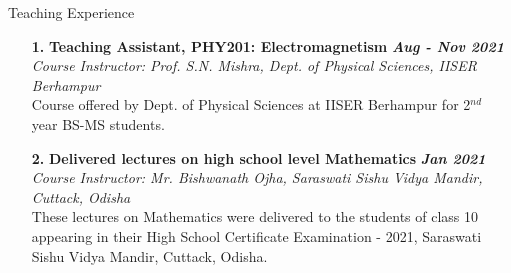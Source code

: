 \documentclass{resume} %
\begin{document}
\begin{rSection}{Teaching Experience}
\begin{enumerate}
\item[\textbf{1.}] {\bf Teaching Assistant, PHY201: Electromagnetism} \hfill {\em \bf Aug - Nov 2021}\\
\textit{Course Instructor: Prof. S.N. Mishra, Dept. of Physical Sciences, IISER Berhampur}\\
Course offered by Dept. of Physical Sciences at IISER Berhampur for 2$^{nd}$ year BS-MS students.

\item[\textbf{2.}] {\bf Delivered lectures on high school level Mathematics} \hfill {\em \bf Jan 2021}\\
\textit{Course Instructor: Mr. Bishwanath Ojha, Saraswati Sishu Vidya Mandir, Cuttack, Odisha}\\
These lectures on Mathematics were delivered to the students of class 10 appearing in their High School Certificate Examination - 2021, Saraswati Sishu Vidya Mandir, Cuttack, Odisha.
\end{enumerate}

\end{rSection}
\end{document}
